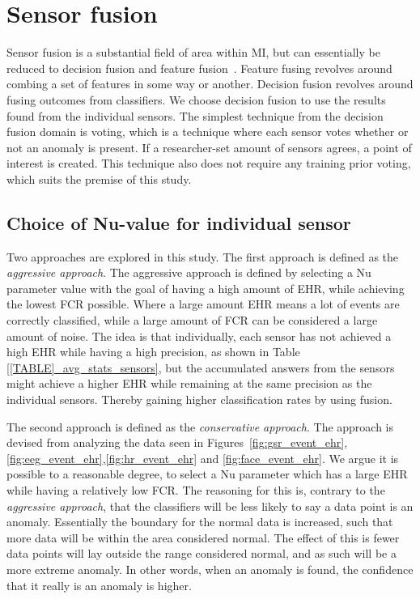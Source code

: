 \section{Sensor fusion}
Sensor fusion is a substantial field of area within MI, but can essentially be reduced to decision fusion and feature fusion~\cite{fusion_techniques}.
Feature fusing revolves around combing a set of features in some way or another.
Decision fusion revolves around fusing outcomes from classifiers.
We choose decision fusion to use the results found from the individual sensors.
The simplest technique from the decision fusion domain is voting, which is a technique where each sensor votes whether or not an anomaly is present.
If a researcher-set amount of sensors agrees, a point of interest is created. 
This technique also does not require any training prior voting, which suits the premise of this study.

\subsection{Choice of Nu-value for individual sensor}
Two approaches are explored in this study.
The first approach is defined as the \textit{aggressive approach}.
The aggressive approach is defined by selecting a Nu parameter value with the goal of having a high amount of EHR, while achieving the lowest FCR possible.
Where a large amount EHR means a lot of events are correctly classified, while a large amount of FCR can be considered a large amount of noise.
The idea is that individually, each sensor has not achieved a high EHR while having a high precision, as shown in Table
\ref{[TABLE]_avg_stats_sensors}, but the accumulated answers from the sensors might achieve a higher EHR while remaining
at the same precision as the individual sensors. 
Thereby gaining higher classification rates by using fusion.

The second approach is defined as the \textit{conservative approach}.
The approach is devised from analyzing the data seen in Figures~\ref{fig:gsr_event_ehr},\ref{fig:eeg_event_ehr},\ref{fig:hr_event_ehr} and \ref{fig:face_event_ehr}.
We argue it is possible to a reasonable degree, to select a Nu parameter which has a large EHR while having a relatively low FCR. 
The reasoning for this is, contrary to the \textit{aggressive approach}, that the classifiers will be less likely to say a data point is an anomaly. 
Essentially the boundary for the normal data is increased, such that more data will be within the area considered normal.
The effect of this is fewer data points will lay outside the range considered normal, and as such will be a more extreme anomaly.
In other words, when an anomaly is found, the confidence that it really is an anomaly is higher.

